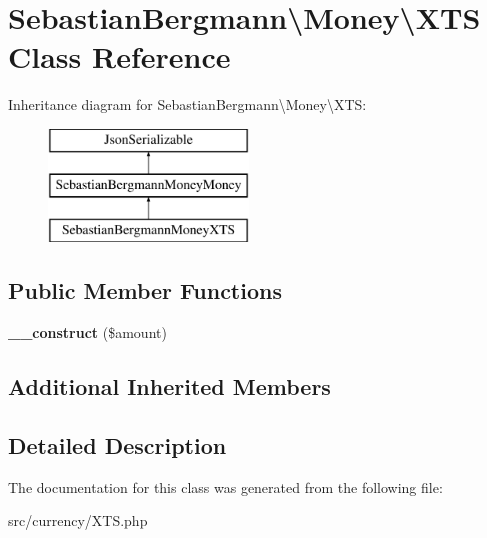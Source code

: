 \hypertarget{classSebastianBergmann_1_1Money_1_1XTS}{}\section{Sebastian\+Bergmann\textbackslash{}Money\textbackslash{}X\+T\+S Class Reference}
\label{classSebastianBergmann_1_1Money_1_1XTS}
Inheritance diagram for Sebastian\+Bergmann\textbackslash{}Money\textbackslash{}X\+T\+S\+:\begin{figure}[H]
\begin{center}
\leavevmode
\includegraphics[height=3.000000cm]{classSebastianBergmann_1_1Money_1_1XTS}
\end{center}
\end{figure}
\subsection*{Public Member Functions}
\begin{DoxyCompactItemize}
\item 
\hypertarget{classSebastianBergmann_1_1Money_1_1XTS_a68867977f59b89eea052b04c26755113}{}{\bfseries \+\_\+\+\_\+construct} (\$amount)\label{classSebastianBergmann_1_1Money_1_1XTS_a68867977f59b89eea052b04c26755113}

\end{DoxyCompactItemize}
\subsection*{Additional Inherited Members}


\subsection{Detailed Description}


The documentation for this class was generated from the following file\+:\begin{DoxyCompactItemize}
\item 
src/currency/X\+T\+S.\+php\end{DoxyCompactItemize}
